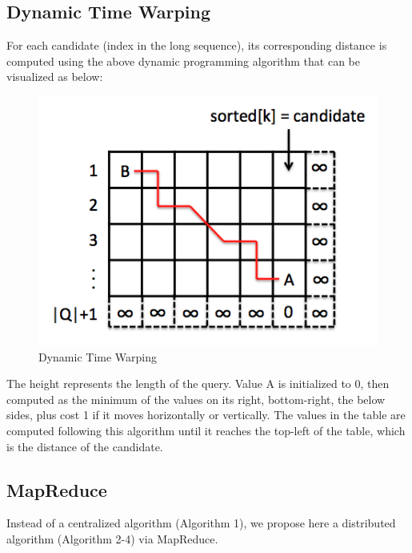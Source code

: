 \documentclass{article}
\begin{document}
\subsection{Dynamic Time Warping}
For each candidate (index in the long sequence), its corresponding distance is computed using the above dynamic programming algorithm that can be visualized as below:
\begin{figure}[htbp]
\begin{center}
\includegraphics[scale=0.5]{dynamic_programming.png}
\end{center}
\caption{Dynamic Time Warping}
\end{figure}


The height represents the length of the query. Value A is initialized to 0, then computed as the minimum of the values on its right, bottom-right, the below sides, plus cost 1 if it moves horizontally or vertically. The values in the table are computed following this algorithm until it reaches the top-left of the table, which is the distance of the candidate. \par

\subsection{MapReduce}
Instead of a centralized algorithm (Algorithm 1), we propose here a distributed algorithm (Algorithm 2-4) via MapReduce. \par
\end{document}
